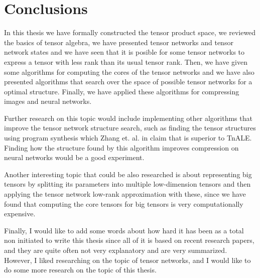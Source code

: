 \documentclass[11pt,a4paper,openright,oneside]{book}
\numberwithin{equation}{section}
\begin{document}
{\chapter{Conclusions}

In this thesis we have formally constructed the tensor product space, we reviewed
the basics of tensor algebra, we have presented tensor networks and tensor network states and we have seen
that it is posible for some tensor networks to express a tensor with less rank than its usual tensor rank.
Then, we have given some algorithms for computing the cores of the tensor networks and we have also presented
algorithms that search over the space of possible tensor networks for a optimal structure. Finally, we have
applied these algorithms for compressing images and neural networks.

Further research on this topic would include implementing other algorithms that improve
the tensor network structure search, such as finding the tensor structures using program synthesis which
Zhang et. al. in \cite{guoTensorNetworkStructure2025} claim that is superior to \gls{TnALE}. Finding how the structure
found by this algorithm improves compression on neural networks would be a good experiment.

Another interesting topic that could be also researched is about representing big tensors by splitting its parameters
into multiple low-dimension tensors and then applying the tensor network low-rank approximation with these, since
we have found that computing the core tensors for big tensors is very computationally expensive.

Finally, I would like to add some words about how hard it has been 
as a total non initiated to write this thesis since all of it is based
on recent research papers, and they are quite often not very explanatory and
are very summarized. However, I liked researching on the topic of tensor networks, and I would like
to do some more research on the topic of this thesis.

}
\end{document}
